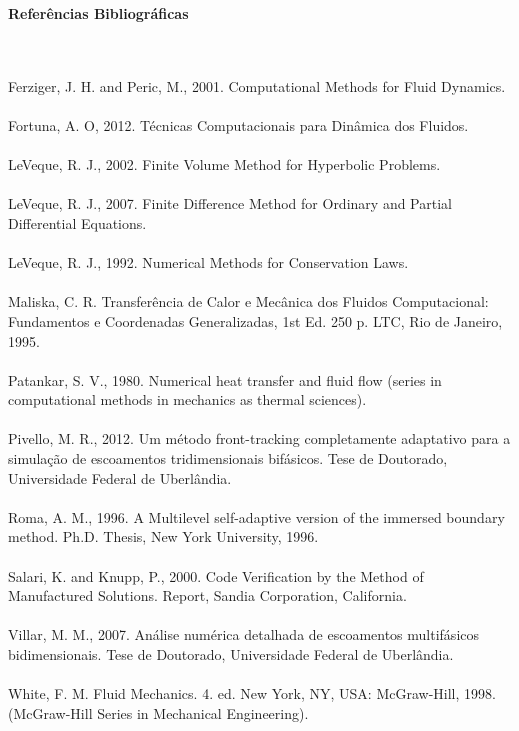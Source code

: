 \begin{large}
\textbf{Referências Bibliográficas}
\end{large} 
\\
\\
Ferziger, J. H. and Peric, M., 2001. Computational Methods for Fluid Dynamics. \\ \\
Fortuna, A. O, 2012. Técnicas Computacionais para Dinâmica dos Fluidos. \\ \\
LeVeque, R. J., 2002. Finite Volume Method for Hyperbolic Problems. \\ \\
LeVeque, R. J., 2007. Finite Difference Method for Ordinary and Partial Differential
Equations. \\ \\
LeVeque, R. J., 1992. Numerical Methods for Conservation Laws. \\ \\
Maliska, C. R. Transferência de Calor e Mecânica dos Fluidos Computacional:
Fundamentos e Coordenadas Generalizadas, 1st Ed. 250 p. LTC, Rio de Janeiro, 1995. \\ \\
Patankar, S. V., 1980. Numerical heat transfer and fluid flow (series in computational
methods in mechanics as thermal sciences). \\ \\
Pivello, M. R., 2012. Um método front-tracking completamente adaptativo para a
simulação de escoamentos tridimensionais bifásicos. Tese de Doutorado, Universidade
Federal de Uberlândia. \\ \\
Roma, A. M., 1996. A Multilevel self-adaptive version of the immersed boundary
method. Ph.D. Thesis, New York University, 1996. \\ \\
Salari, K. and Knupp, P., 2000. Code Verification by the Method of Manufactured
Solutions. Report, Sandia Corporation, California. \\ \\
Villar, M. M., 2007. Análise numérica detalhada de escoamentos multifásicos
bidimensionais. Tese de Doutorado, Universidade Federal de Uberlândia. \\ \\
White, F. M. Fluid Mechanics. 4. ed. New York, NY, USA: McGraw-Hill, 1998.
(McGraw-Hill Series in Mechanical Engineering). \\

%
